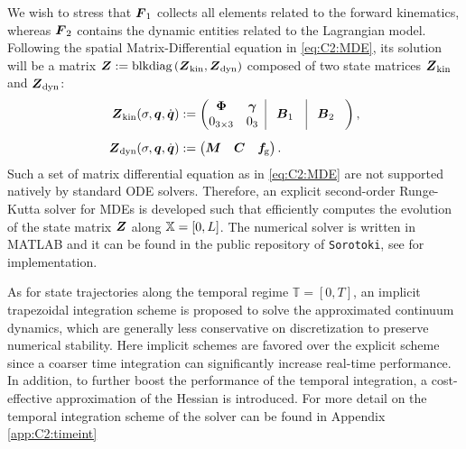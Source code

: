 %
%   
%
We wish to stress that $\boldsymbol{F}_1$ collects all elements related to the forward kinematics, whereas $\boldsymbol{F}_2$ contains the dynamic entities related to the Lagrangian model. Following the spatial Matrix-Differential equation in \eqref{eq:C2:MDE}, its solution will be a matrix $\boldsymbol{Z} := \text{blkdiag}\left( \boldsymbol{Z}_\textrm{kin}, \boldsymbol{Z}_\textrm{dyn} \right)$ composed of two state matrices $\boldsymbol{Z}_\textrm{kin}$ and $\boldsymbol{Z}_\textrm{dyn}$:
%
\begin{align}
\mat{Z}_\textrm{kin}(\sigma,\q,\dq) & := \begin{pmatrix}
\begin{matrix}
\PhiB  & \gammaB \\ 0_{3\times3} &  0_{3}
\end{matrix} \;\; \vrule & \!\mat{B}_1 & \vrule & \!\mat{B}_2 \;\;\;
 \end{pmatrix}, \\[0.5em]
\mat{Z}_\textrm{dyn}(\sigma,\q,\dq) & := \begin{pmatrix} \mat{M} & \mat{C} & \mat{f}\!\grav \end{pmatrix}.
\end{align}
%
Such a set of matrix differential equation as in \eqref{eq:C2:MDE} are not supported natively by standard ODE solvers. Therefore, an explicit second-order Runge-Kutta solver for MDEs is developed such that efficiently computes the evolution of the state matrix $\boldsymbol{Z}$ along $\mathbb{X} = [0,L]$. The numerical solver is written in MATLAB\textsuperscript{\scriptsize\textregistered} and it can be found in the public repository of \texttt{Sorotoki}, see \cite{SorotokiCode} for implementation.

As for state trajectories along the temporal regime $\mathbb{T} = [0,T]$, an implicit trapezoidal integration scheme is proposed to solve the approximated continuum dynamics, which are generally less conservative on discretization to preserve numerical stability. Here implicit schemes are favored over the explicit scheme since a coarser time integration can significantly increase real-time performance. In addition, to further boost the performance of the temporal integration, a cost-effective approximation of the Hessian is introduced. For more detail on the temporal integration scheme of the solver can be found in Appendix \ref{app:C2:timeint}
